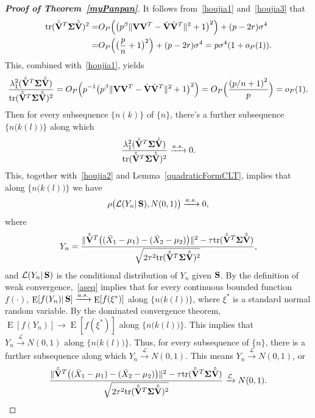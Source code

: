\documentclass[3p]{elsarticle}
\DeclareMathOperator{\mytr}{tr}
\DeclareMathOperator{\myE}{E}
\theoremstyle{plain}
\theoremstyle{definition}
\theoremstyle{remark}
\begin{document}
\begin{appendices}
\begin{proof}[\textbf{Proof of Theorem~\ref{myPanpan}}]
It follows from~\eqref{houjia1} and~\eqref{houjia3} that
\begin{equation}\label{traceA1}
    \begin{aligned}
        \mytr(\hat{\tilde{\BV}}^T\bSigma\hat{\tilde{\BV}})^2=&
    O_P\Big(\big(p^{\beta}\|\BV\BV^T-\hat{\BV}\hat{\BV}^T\|^2+1\big)^2\Big)
    +
    (p-2r)\sigma^4\\
    =&
        O_P\Big(\big(\frac{p}{n}+1\big)^2\Big)
    +
    (p-2r)\sigma^4
    =p\sigma^4(1+o_P(1)).
    \end{aligned}
\end{equation}
This, combined with~\eqref{houjia1}, yields
$$
\frac{\lambda_1^2(\hat{\tilde{\BV}}^T\bSigma\hat{\tilde{\BV}})}{\mytr(\hat{\tilde{\BV}}^T\bSigma\hat{\tilde{\BV}})^2}
=O_P\Big(p^{-1}\big(p^{\beta}\|\BV\BV^T-\hat{\BV}\hat{\BV}^T\|^2+1\big)^2\Big)
        =O_P\Big(\frac{{(p/n+1)}^2}{p}\Big)=o_P(1).
$$
Then for every subsequence $\{n(k)\}$ of $\{n\}$, there's a further subsequence $\big\{n\big(k(l)\big)\big\}$ along which
$$
\frac{\lambda_1^2(\hat{\tilde{\BV}}^T\bSigma\hat{\tilde{\BV}})}{\mytr(\hat{\tilde{\BV}}^T\bSigma\hat{\tilde{\BV}})^2}\xrightarrow{a.s.}0.
$$
This, together with~\eqref{houjia2} and Lemma~\ref{quadraticFormCLT}, implies that along $\big\{n\big(k(l)\big)\big\}$ we have
\begin{equation}\label{aseq}
    \rho\big(\mathcal{L}( Y_n |\,\mathbf{S}),N(0,1)\big)\xrightarrow{a.s.}0,
\end{equation}
where 
$$
Y_n=\frac{\|\hat{\tilde{\mathbf{V}}}^T\big((\bar{X}_1-\mu_1)-(\bar{X}_2-\mu_2)\big)\|^2-\tau\mathrm{tr}(\hat{\tilde{\mathbf{V}}}^T\boldsymbol{\Sigma}\hat{\tilde{\mathbf{V}}})}{\sqrt{2\tau^2\mathrm{tr}(\hat{\tilde{\mathbf{V}}}^T\boldsymbol{\Sigma}\hat{\tilde{\mathbf{V}}})^2}},
$$
and $\mathcal{L}(Y_n|\,\mathbf{S})$ is the conditional distribution of $Y_n$ given $\mathbf{S}$.
By the definition of weak convergence,~\eqref{aseq} implies that for every continuous bounded function $f(\cdot)$, $\myE[f(Y_n)|\,\BS]\xrightarrow{a.s.}\myE[f(\xi^*)]$ along $\big\{n\big(k(l)\big)\big\}$, where $\xi^*$ is a standard normal random variable.
By the dominated convergence theorem, $\myE[f(Y_n)]\to \myE[f(\xi^*)]$ along $\big\{n\big(k(l)\big)\big\}$.
This implies that $Y_n\xrightarrow{\mathcal{L}}N(0,1)$ along $\big\{n\big(k(l)\big)\big\}$.
Thus, for every subsequence of $\{n\}$, there is a further subsequence along which
$Y_n\xrightarrow{\mathcal{L}}N(0,1)$.
This means $Y_n\xrightarrow{\mathcal{L}}N(0,1)$, or
$$
\frac{\|\hat{\tilde{\mathbf{V}}}^T\big((\bar{X}_1-\mu_1)-(\bar{X}_2-\mu_2)\big)\|^2-\tau\mathrm{tr}(\hat{\tilde{\mathbf{V}}}^T\boldsymbol{\Sigma}\hat{\tilde{\mathbf{V}}})}{\sqrt{2\tau^2\mathrm{tr}(\hat{\tilde{\mathbf{V}}}^T\boldsymbol{\Sigma}\hat{\tilde{\mathbf{V}}})^2}}\xrightarrow{\mathcal{L}}N(0,1).
$$



\end{proof}
\end{appendices}
\end{document}
